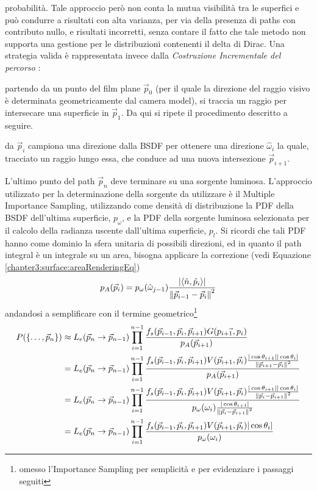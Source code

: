 probabilit\`a. Tale approccio per\`o non conta la mutua visibilit\`a tra le superfici e pu\`o condurre a risultati con alta varianza, per via della 
presenza di paths con contributo nullo, e risultati incorretti, senza contare il fatto che tale metodo non supporta una gestione per le distribuzioni
contenenti il delta di Dirac. Una strategia valida \`e rappresentata invece dalla \textit{Costruzione Incrementale del percorso} \cite{pharr}:\par
partendo da un punto del film plane $\vec{p}_0$ (per il quale la direzione del raggio visivo \`e determinata geometricamente dal camera model),
si traccia un raggio per intersecare una superficie in $\vec{p}_1$. Da qui si ripete il procedimento descritto a seguire.\par
da $\vec{p}_i$ campiona una direzione dalla BSDF per ottenere una direzione $\hat{\omega}_i$ la quale, tracciato un raggio lungo essa, che conduce ad 
una nuova intersezione $\vec{p}_{i+1}$.\par
L'ultimo punto del path $\vec{p}_n$ deve terminare su una sorgente luminosa. L'approccio utilizzato per la determinazione della sorgente da utilizzare
\`e il Multiple Importance Sampling, utilizzando come densit\`a di distribuzione la PDF della BSDF dell'ultima superficie, $p_\omega$, e la PDF 
della sorgente luminosa selezionata per il calcolo della radianza uscente dall'ultima superficie, $p_l$. Si ricordi che tali PDF hanno come dominio
la sfera unitaria di possibili direzioni, ed 
in quanto il path integral \`e un integrale su un area, bisogna applicare la correzione (vedi Equazione \ref{chapter3:surface:areaRenderingEq})
\begin{equation}
	p_A(\vec{p}_i)=p_\omega(\hat{\omega}_{j-1})\frac{|\langle\hat{n},\hat{p}_i\rangle|}{\norm{\vec{p}_{i-1}-\vec{p}_i}^2}
\end{equation}
andandosi a semplificare con il termine geometrico\footnote{omesso l'Importance Sampling per semplicit\`a e per evidenziare i passaggi seguiti}
\begin{align}
	P(\{\ldots,\vec{p}_{n}\})&\approx L_e(\vec{p}_n\to\vec{p}_{n-1})\prod_{i=1}^{n-1}\frac{f_s(\vec{p}_{i-1},\vec{p}_i,\vec{p}_{i+1})G(\vec{p_{i+1},p_{i}})}
		{p_A(\vec{p}_{i+1})} \nonumber \\
	&=L_e(\vec{p}_n\to\vec{p}_{n-1})\prod_{i=1}^{n-1}\frac{f_s(\vec{p}_{i-1},\vec{p}_i,\vec{p}_{i+1})V(\vec{p}_{i+1},\vec{p}_i)
		\frac{|\cos\theta_{i+1}||\cos\theta_i|}{\norm{\vec{p}_{i+1}-\vec{p}_i}^2}}{p_A(\vec{p}_{i+1})} \nonumber \\
	&=L_e(\vec{p}_n\to\vec{p}_{n-1})\prod_{i=1}^{n-1}\frac{f_s(\vec{p}_{i-1},\vec{p}_i,\vec{p}_{i+1})V(\vec{p}_{i+1},\vec{p}_i)
		\frac{|\cos\theta_{i+1}||\cos\theta_i|}{\norm{\vec{p}_i-\vec{p}_{i+1}}^2}}
		{p_\omega(\omega_i)\frac{|\cos\theta_{i+1}|}{\norm{\vec{p}_i-\vec{p}_{i+1}}^2}} \nonumber \\
	&=L_e(\vec{p}_n\to\vec{p}_{n-1})\prod_{i=1}^{n-1}\frac{f_s(\vec{p}_{i-1},\vec{p}_i,\vec{p}_{i+1})V(\vec{p}_{i+1},\vec{p}_i)
		|\cos\theta_i|}{p_\omega(\omega_i)}
\end{align}

